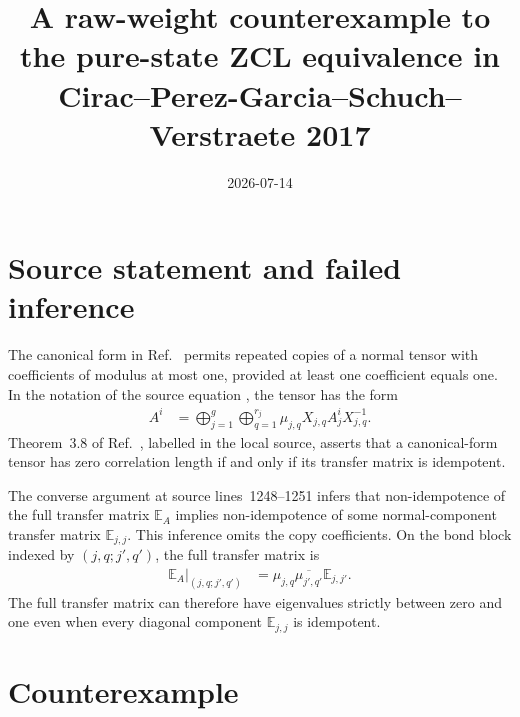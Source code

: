 \documentclass{article}
\title{A raw-weight counterexample to the pure-state ZCL equivalence in
Cirac--Perez-Garcia--Schuch--Verstraete 2017}
\author{}
\date{2026-07-14}
\begin{document}
\maketitle
{}

\section{Source statement and failed inference}

The canonical form in Ref.~\cite{Cirac2016MPDO_arXiv} permits repeated copies
of a normal tensor with coefficients of modulus at most one, provided at least
one coefficient equals one. In the notation of the source equation
, the tensor has the form
\begin{align}
    A^i
        &= \bigoplus_{j=1}^g\bigoplus_{q=1}^{r_j}
        \mu_{j,q}X_{j,q}A_j^iX_{j,q}^{-1}.
    \label{eq:cpsv16_pure_zcl_raw_weight_counterexample_canonical_form}
\end{align}
Theorem~3.8 of Ref.~\cite{Cirac2016MPDO_arXiv}, labelled
 in the local source, asserts that a canonical-form tensor
has zero correlation length if and only if its transfer matrix is idempotent.

The converse argument at source lines~1248--1251 infers that
non-idempotence of the full transfer matrix $\mathbb E_A$ implies
non-idempotence of some normal-component transfer matrix
$\mathbb E_{j,j}$. This inference omits the copy coefficients. On the bond
block indexed by $(j,q;j',q')$, the full transfer matrix is
\begin{align}
    \left.\mathbb E_A\right|_{(j,q;j',q')}
        &= \mu_{j,q}\overline{\mu_{j',q'}}\mathbb E_{j,j'}.
    \label{eq:cpsv16_pure_zcl_raw_weight_counterexample_weighted_transfer_block}
\end{align}
The full transfer matrix can therefore have eigenvalues strictly between zero
and one even when every diagonal component $\mathbb E_{j,j}$ is idempotent.

\section{Counterexample}
\end{document}
